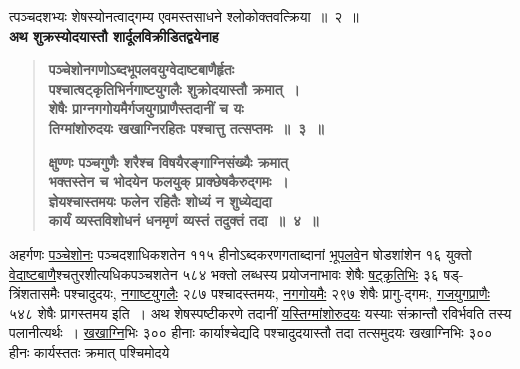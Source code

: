\documentclass[11pt, openany]{book}
\begin{document}
\newpage

\begin{sloppypar}
\noindent त्पञ्चदशभ्यः शेषस्योनत्वाद्गम्य एवमस्तसाधने श्लोकोक्तवत्क्रिया~॥~२~॥\\

{\small \textbf{अथ शुक्रस्योदयास्तौ शार्दूलविक्रीडितद्वयेनाह\textendash }}

 \label{6.3}
\begin{quote}
{\large \textbf{{\color{purple}पञ्चेशोनगणोऽब्दभूपलवयुग्वेदाष्टबाणैर्हृतः \\
पश्चात्षट्कृतिभिर्नगाष्टयुगलैः शुक्रोदयास्तौ क्रमात्~। \\
शेषैः प्राग्नगगोयमैर्गजयुगप्राणैस्तदानीं च यः \\
तिग्मांशोरुदयः खखाग्निरहितः पश्चात्तु तत्सप्तमः~॥~३~॥ }}
\vspace{1mm}

 \label{6.4}
\textbf{{\color{purple}क्षुण्णः पञ्चगुणैः शरैश्च विषयैरङ्गाग्निसंख्यैः क्रमात्\\
भक्तस्तेन च भोदयेन फलयुक् प्राक्छेषकैरुद्गमः~। \\
ज्ञेयश्चास्तमयः फलेन रहितैः शोध्यं न शुध्येद्यदा \\
कार्यं व्यस्तविशोधनं धनमृणं व्यस्तं तदुक्तं तदा~॥~४~॥ }}}
\end{quote}

अहर्गणः \hyperref[6.3]{पञ्चेशोनः} पञ्चदशाधिकशतेन ११५ हीनोऽब्दकरणगताब्दानां \hyperref[6.3]{भूपलवे}न षोडशांशेन १६ युक्तो \hyperref[6.3]{वेदाष्टबाणै}श्चतुरशीत्यधिकपञ्चशतेन ५८४ भक्तो लब्धस्य प्रयोजनाभावः शेषैः \hyperref[6.3]{षट्कृतिभिः} ३६ षड्-त्रिंशतासमैः पश्चादुदयः, \hyperref[6.3]{नगाष्टयुगलैः} २८७ पश्चादस्तमयः, \hyperref[6.3]{नगगोयमैः} २९७ शेषैः प्रागु-द्गमः, \hyperref[6.3]{गजयुगप्राणैः} ५४८ शेषैः प्रागस्तमय इति~। अथ शेषस्पष्टीकरणे तदानीं \hyperref[6.3]{यस्तिग्मांशोरुदयः} यस्याः संक्रान्तौ रविर्भवति तस्य पलानीत्यर्थः~। \hyperref[6.3]{खखाग्नि}भिः ३०० हीनाः कार्याश्चेद्यदि पश्चादुदयास्तौ तदा तत्समुदयः खखाग्निभिः ३०० हीनः कार्यस्ततः क्रमात् पश्चिमोदये 
\end{sloppypar}

\newpage
\end{document}
